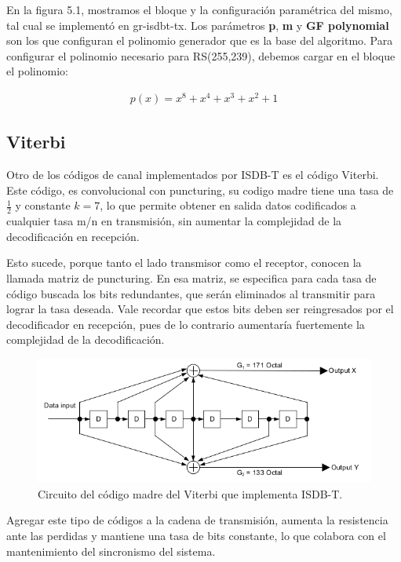 En la figura 5.1, mostramos el bloque y la configuración paramétrica del mismo, tal cual se implementó en gr-isdbt-tx. Los parámetros \textbf{p}, \textbf{m} y \textbf{GF polynomial} son los que configuran el polinomio generador que es la base del algoritmo. Para configurar el polinomio necesario para RS(255,239), debemos cargar en el bloque el polinomio:

\begin{gather*}
	p(x) = x^8 + x^4 + x^3 + x^2 + 1
\end{gather*}

	\subsection{Viterbi}
	Otro de los códigos de canal implementados por ISDB-T es el código Viterbi. Este código, es  convolucional con puncturing, su codigo madre tiene una tasa de $\frac{1}{2}$ y constante $k = 7$, lo que permite obtener en salida datos codificados a cualquier tasa m/n en transmisión, sin aumentar la complejidad de la decodificación en recepción. 
	
	Esto sucede, porque tanto el lado transmisor como el receptor, conocen la llamada matriz de puncturing. En esa matriz, se especifica para cada tasa de código buscada los bits redundantes, que serán eliminados al transmitir para lograr la tasa deseada. Vale recordar que estos bits deben ser reingresados por el decodificador en recepción, pues de lo contrario aumentaría fuertemente la complejidad de la decodificación.
	
	\begin{figure}[h!]
		\centering
		\includegraphics[scale=0.5]{figuras/cap05/viterbi}
		\caption{\label{f:viterbi} Circuito del código madre del Viterbi que implementa ISDB-T.}
	\end{figure}
	
	Agregar este tipo de códigos a la cadena de transmisión, aumenta la resistencia ante las perdidas y mantiene una tasa de bits constante, lo que colabora con el mantenimiento del sincronismo del sistema.
	
